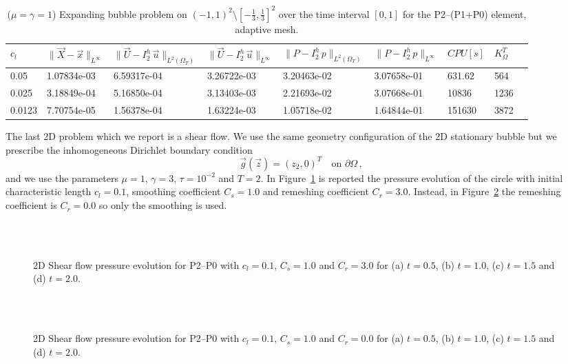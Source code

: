 \documentclass[a4paper,12pt,onecolumn]{article}
\newcommand{\errorXx}{\|\vec{X} - \vec{x}\|_{L^\infty}}
\newcommand{\LerrorUu}[1]{\|\vec U - I^h_{#1}\,\vec u\|_{L^2(\Omega_T)}}
\newcommand{\errorUu}[1]{\|\vec U - I^h_{#1}\,\vec u\|_{L^\infty}}
\newcommand{\errorPp}[1]{\|P - I^h_{#1}\,p\|_{L^\infty}}
\newcommand{\LerrorPp}[1]{\|P - I^h_{#1}\,p\|_{L^2(\Omega_T)}}
\begin{document}
\begin{table}
 \center
 \hspace*{-2cm}
\begin{tabular}{lllllllll}
\hline
$c_l$ & $\errorXx$ & $\LerrorUu2$ & $\errorUu2$ & $\LerrorPp2$ & $\errorPp2$ & $CPU[s]$ & $K_\Omega^T$\\
\hline
0.05 & 1.07834e-03 & 6.59317e-04 & 3.26722e-03 & 3.20463e-02 & 3.07658e-01 & 631.62 & 564\\
0.025 & 3.18849e-04 & 5.16850e-04 & 3.13403e-03 & 2.21693e-02 & 3.07668e-01 & 10836 & 1236\\
0.0123 & 7.70754e-05 & 1.56378e-04 & 1.63224e-03 & 1.05718e-02 & 1.64844e-01 & 151630 & 3872\\%
\hline
\end{tabular}
\hspace*{-2cm}
\caption{($\mu=\gamma=1$) Expanding bubble problem on $(-1,1)^2\setminus[-\frac{1}{3},\frac{1}{3}]^2$ over the time interval $[0,1]$ for the P2--(P1+P0) element, adaptive mesh.}
\label{tab:expandingbubble2Dp2p1p0adaptive}
\end{table}

The last 2D problem which we report is a shear flow. We use the same geometry configuration of the 2D stationary bubble but we prescribe the inhomogeneous Dirichlet boundary condition
\begin{equation*}
\vec g(\vec z)=(z_2,0)^T\quad \mbox{on }\partial\Omega\,,
\end{equation*}
and we use the parameters $\mu=1$, $\gamma=3$, $\tau=10^{-2}$ and $T=2$. In Figure~\ref{fig:shear_2d} is reported the pressure evolution of the circle with initial characteristic length $c_l=0.1$, smoothing coefficient $C_s=1.0$ and remeshing coefficient $C_r=3.0$. Instead, in Figure~\ref{fig:shear_2d_smooth} the remeshing coefficient is $C_r=0.0$ so only the smoothing is used.
\begin{figure}[htbp]
  \centering
  \quad
  \\
  \quad
  \\
  \caption{2D Shear flow pressure evolution for P2--P0 with $c_l=0.1$, $C_s=1.0$ and $C_r=3.0$ for (a) $t=0.5$, (b) $t=1.0$, (c) $t=1.5$ and (d) $t=2.0$.}
  \label{fig:shear_2d}
\end{figure}

\begin{figure}[htbp]
  \centering
  \quad
  \\
  \quad
  \\
  \caption{2D Shear flow pressure evolution for P2--P0 with $c_l=0.1$, $C_s=1.0$ and $C_r=0.0$ for (a) $t=0.5$, (b) $t=1.0$, (c) $t=1.5$ and (d) $t=2.0$.}
  \label{fig:shear_2d_smooth}
\end{figure}
\end{document}

